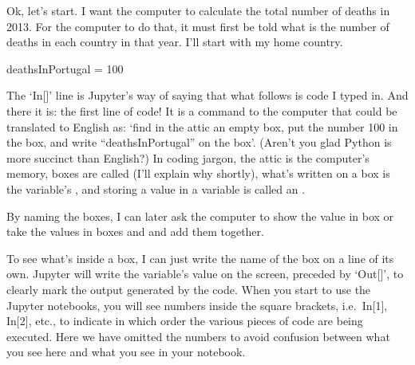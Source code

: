 \documentclass[letterpaper,10pt,english]{sphinxmanual}
\begin{document}
Ok, let’s start. I want the computer to calculate the total number of deaths in 2013. For the computer to do that, it must first be told what is the number of deaths in each country in that year. I’ll start with my home country.


{
\begin{sphinxVerbatim}[commandchars=\\\{\}]
\llap{\color{nbsphinxin}[ ]:\,\hspace{\fboxrule}\hspace{\fboxsep}}
deathsInPortugal = 100
\end{sphinxVerbatim}
}

The ‘In{[}{]}’ line is Jupyter’s way of saying that what follows is code I typed in. And there it is: the first line of code! It is a command to the computer that could be translated to English as: ‘find in the attic an empty box, put the number 100 in the box, and write “deathsInPortugal” on the box’. (Aren’t you glad Python is more succinct than English?) In coding jargon, the attic is the computer’s memory, boxes are called  (I’ll explain why shortly), what’s written on a box is the
variable’s  , and storing a value in a variable is called an .

By naming the boxes, I can later ask the computer to show the value in box  or take the values in boxes  and  and add them together.

To see what’s inside a box, I can just write the name of the box on a line of its own. Jupyter will write the variable’s value on the screen, preceded by ‘Out{[}{]}’, to clearly mark the output generated by the code. When you start to use the Jupyter notebooks, you will see numbers inside the square brackets, i.e. In{[}1{]}, In{[}2{]}, etc., to indicate in which order the various pieces of code are being executed. Here we have omitted the numbers to avoid confusion between what you see here and what you see
in your notebook.

\end{document}
